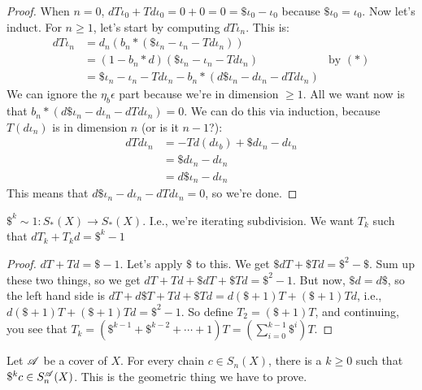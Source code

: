 \begin{proof}
When $n=0$, $dT\iota_0 + Td\iota_0 = 0+0 = 0 = \$\iota_0 - \iota_0$ because $\$\iota_0=\iota_0$. Now let's induct. For $n\geq 1$, let's start by computing $dT\iota_n$. This is:
\begin{align*}
dT\iota_n & = d_n(b_n\ast(\$\iota_n - \iota_n - Td\iota_n)) & \\
& = (1-b_n\ast d)(\$\iota_n - \iota_n - Td\iota_n) & \text{by $(\ast)$}\\
 & = \$\iota_n-\iota_n-Td\iota_n-b_n\ast (d\$\iota_n - d\iota_n - dTd\iota_n)
\end{align*}
We can ignore the $\eta_b\epsilon$ part because we're in dimension $\geq 1$. All we want now is that $b_n\ast(d\$\iota_n - d\iota_n - dTd\iota_n)=0$. We can do this via induction, because $T(d\iota_n)$ is in dimension $n$ (or is it $n-1$?):
\begin{align*}
dTd\iota_n & = -Td(d\iota_b)+\$ d\iota_n - d\iota_n\\
& = \$d\iota_n - d\iota_n\\
& = d\$\iota_n - d\iota_n
\end{align*}
This means that $d\$\iota_n-d\iota_n - dTd\iota_n=0$, so we're done.
\end{proof}
\begin{corollary}
$\$^k\sim 1:S_\ast(X)\to S_\ast(X)$. I.e., we're iterating subdivision. We want $T_k$ such that $dT_k+T_kd=\$^k-1$
\end{corollary}
\begin{proof}
$dT+Td=\$-1$. Let's apply $\$$ to this. We get $\$dT+\$Td=\$^2-\$$. Sum up these two things, so we get $dT+Td+\$dT+\$Td = \$^2-1$. But now, $\$d=d\$$, so the left hand side is $dT+d\$T + Td+\$Td = d(\$+1)T + (\$+1)Td$, i.e., $d(\$+1)T+(\$+1)Td=\$^2-1$. So define $T_2=(\$+1)T$, and continuing, you see that $T_k=(\$^{k-1}+\$^{k-2}+\cdots+1)T=\left(\sum^{k-1}_{i=0}\$^i\right)T$.
\end{proof}
\begin{prop}
Let $\mathscr{A}$ be a cover of $X$. For every chain $c\in S_n(X)$, there is a $k\geq 0$ such that $\$^kc\in S^{\mathscr{A}}_n(X)$. This is the geometric thing we have to prove.
\end{prop}
